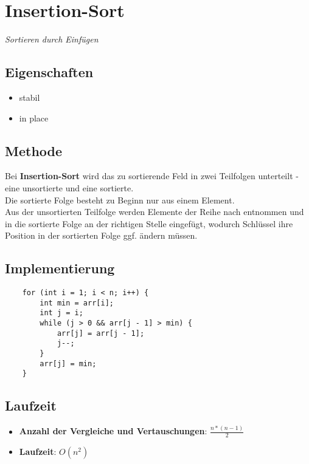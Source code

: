 \section{Insertion-Sort}

\textit{Sortieren durch Einfügen}

\subsection{Eigenschaften}
\begin{itemize}
    \item stabil
    \item in place
\end{itemize}

\subsection{Methode}
Bei \textbf{Insertion-Sort} wird das zu sortierende Feld in zwei Teilfolgen unterteilt - eine unsortierte und eine sortierte.\\
Die sortierte Folge besteht zu Beginn nur aus einem Element.\\
Aus der unsortierten Teilfolge werden Elemente der Reihe nach entnommen und in die sortierte Folge an der richtigen Stelle eingefügt, wodurch Schlüssel ihre Position in der sortierten Folge ggf. ändern müssen.


\subsection{Implementierung}
\begin{verbatim}
    for (int i = 1; i < n; i++) {
        int min = arr[i];
        int j = i;
        while (j > 0 && arr[j - 1] > min) {
            arr[j] = arr[j - 1];
            j--;
        }
        arr[j] = min;
    }
\end{verbatim}


\subsection{Laufzeit}
\begin{itemize}
    \item \textbf{Anzahl der Vergleiche und Vertauschungen}: $\frac{n * ( n - 1)}{2}$
    \item \textbf{Laufzeit}: $O(n^2)$
\end{itemize}